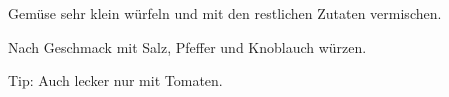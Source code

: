 {Gem\"use sehr klein w\"urfeln und mit den restlichen Zutaten vermischen.

Nach Geschmack mit Salz, Pfeffer und Knoblauch würzen.

Tip: Auch lecker nur mit Tomaten. }
